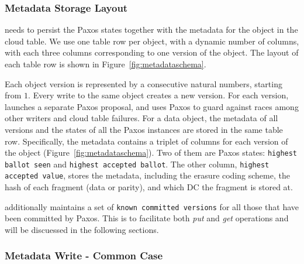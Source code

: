 \subsubsection{Metadata Storage Layout}

\name needs to persist the Paxos states together with the metadata for the object in the cloud table. 
We use one table row per object, with a dynamic number of columns, with each three columns corresponding to one version of the object. The layout of each table row is
shown in Figure~\ref{fig:metadataschema}.

Each object version is represented by a consecutive natural numbers, starting from $1$.
Every \name write to the same object creates a new version.
For each version, \name launches a separate Paxos proposal, and uses Paxos to guard against races among other \name writers and cloud table failures.
For a data object, the metadata of all versions and the states of all the Paxos instances are stored in the same table row.
Specifically, the metadata contains a triplet of columns for each version of the object
(Figure~\ref{fig:metadataschema}).
Two of them are Paxos states: {\tt highest ballot seen} and {\tt highest accepted ballot}.
The other column, {\tt highest accepted value}, stores the metadata, including the erasure coding scheme,
the hash of each fragment (data or parity), and which DC the fragment is stored at.

{\name} additionally maintains a set of {\tt known committed versions} 
for all those that have been committed by Paxos. This is to facilitate both {\em put} and {\em get} operations and will be discuessed in the following sections.

\subsubsection{Metadata Write - Common Case}

